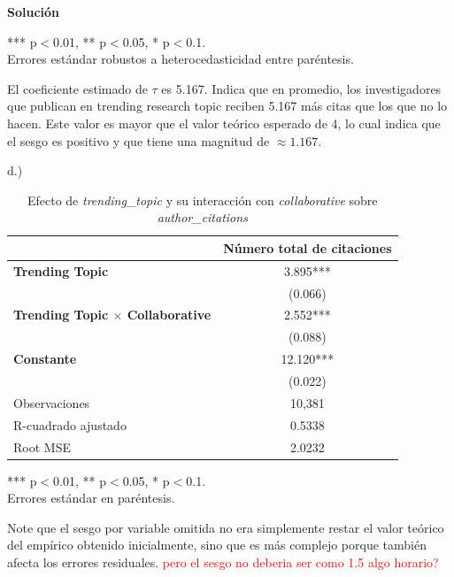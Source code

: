 \documentclass[a4paper, answers, addpoints, 11pt]{exam}
\newenvironment{solucion}{%
  \begin{mdframed}[
    backgroundcolor=blue!5,    %
    linecolor=blue!50,          %
    linewidth=2pt,              %
    leftmargin=10pt,            %
    rightmargin=10pt,           %
    topline=true,              %
    bottomline=true,            %
    roundcorner=10pt,           %
    innerleftmargin=10pt,       %
    innerrightmargin=10pt,      %
    innerbottommargin=10pt,     %
    innertopmargin=10pt         %
  ]%
  \begin{tcolorbox}[colframe=blue!50!black, colback=blue!50, coltitle=white, sharp corners=all, boxrule=1mm, width=\textwidth, halign=left, valign=center, top=0mm, bottom=0mm, left=0mm, right=0mm] \textbf{Solución} \end{tcolorbox} }{\end{mdframed}}
\begin{document}
\begin{itemize}
\begin{solucion}
\begin{table}[H]
    \vspace{0.3cm}
    \footnotesize{*** p$<$0.01, ** p$<$0.05, * p$<$0.1. \\
    Errores estándar robustos a heterocedasticidad entre paréntesis.}
\end{table}

El coeficiente estimado de $\tau$ es 5.167. Indica que en promedio, los investigadores que publican en trending research topic reciben 5.167 más citas que los que no lo hacen. Este valor es  mayor que el valor teórico esperado de 4, lo cual indica que el sesgo es positivo y que tiene una magnitud de $\approx 1.167$.

        d.)
        \begin{table}[H]
    \centering
    \caption{Efecto de \textit{trending\_topic} y su interacción con \textit{collaborative} sobre \textit{author\_citations}}
    \label{tab:resultados}
    \begin{tabular}{l c}
        \toprule
        & Número total de citaciones \\
        \midrule
        \textbf{Trending Topic} & 3.895*** \\
        & (0.066) \\
        \textbf{Trending Topic $\times$ Collaborative} & 2.552*** \\
        & (0.088) \\
        \textbf{Constante} & 12.120*** \\
        & (0.022) \\
        \midrule
        Observaciones & 10,381 \\
        R-cuadrado ajustado & 0.5338 \\
        Root MSE & 2.0232 \\
        \bottomrule
    \end{tabular}
    
    \vspace{0.3cm}
    \footnotesize{*** p$<$0.01, ** p$<$0.05, * p$<$0.1. \\
    Errores estándar en paréntesis.}
\end{table}
Note que el sesgo por variable omitida no era simplemente restar el valor teórico del empírico obtenido inicialmente, sino que es más complejo porque también afecta los errores residuales.
\textcolor{red}{pero el sesgo no deberia ser como 1.5 algo horario?}
        
        \end{solucion}
    

\end{itemize}
\bigskip
\end{document}

